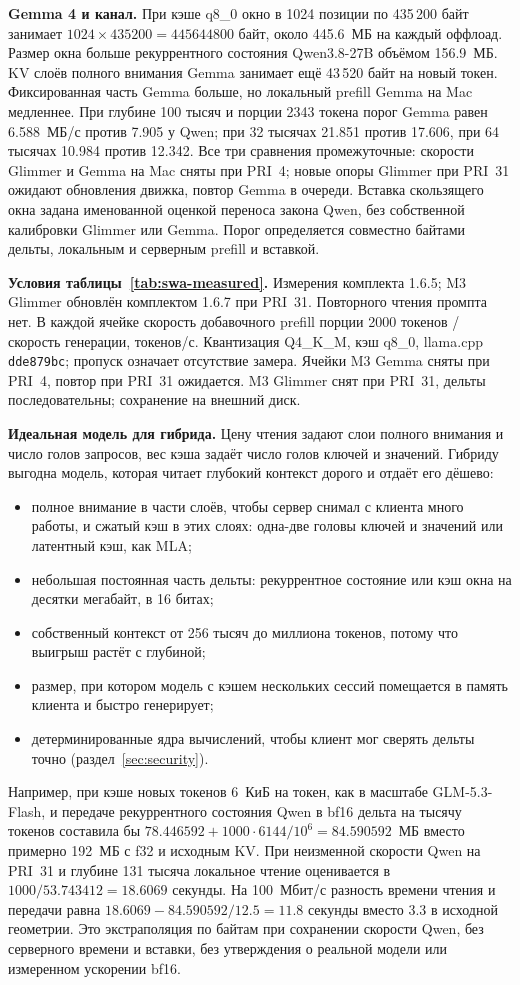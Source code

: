 \textbf{Gemma 4 и канал.} При кэше q8\_0 окно в 1024 позиции по 435\,200 байт
занимает $1024\times435200=445644800$ байт, около 445.6~МБ на каждый оффлоад.
Размер окна больше рекуррентного состояния Qwen3.8-27B объёмом 156.9~МБ.
KV слоёв полного внимания Gemma занимает ещё 43\,520 байт на новый токен.
Фиксированная часть Gemma больше, но локальный prefill Gemma на Mac медленнее.
При глубине 100 тысяч и порции 2343 токена порог Gemma равен 6.588~МБ/с против 7.905 у Qwen;
при 32 тысячах 21.851 против 17.606, при 64 тысячах 10.984 против 12.342.
Все три сравнения промежуточные: скорости Glimmer и Gemma на Mac сняты при PRI~4;
новые опоры Glimmer при PRI~31 ожидают обновления движка, повтор Gemma в очереди. Вставка скользящего окна задана именованной оценкой переноса закона Qwen,
без собственной калибровки Glimmer или Gemma.
Порог определяется совместно байтами дельты, локальным и серверным prefill и вставкой.

\textbf{Условия таблицы~\ref{tab:swa-measured}.} Измерения комплекта 1.6.5; M3 Glimmer обновлён комплектом 1.6.7 при PRI~31. Повторного чтения промпта нет. В каждой ячейке скорость
добавочного prefill порции 2000 токенов / скорость генерации, токенов/с.
Квантизация Q4\_K\_M, кэш q8\_0, llama.cpp \texttt{dde879bc}; пропуск означает отсутствие замера. Ячейки M3 Gemma сняты при PRI~4, повтор при PRI~31 ожидается. M3 Glimmer снят при PRI~31, дельты последовательны; сохранение на внешний диск.

\textbf{Идеальная модель для гибрида.} Цену чтения задают слои полного внимания и число голов запросов, вес кэша
задаёт число голов ключей и значений. Гибриду выгодна модель, которая читает глубокий контекст дорого и отдаёт его
дёшево:
\begin{itemize}
\item полное внимание в части слоёв, чтобы сервер снимал с клиента много работы, и сжатый кэш в этих слоях: одна-две
головы ключей и значений или латентный кэш, как MLA;
\item небольшая постоянная часть дельты: рекуррентное состояние или кэш окна на десятки мегабайт, в 16 битах;
\item собственный контекст от 256 тысяч до миллиона токенов, потому что выигрыш растёт с глубиной;
\item размер, при котором модель с кэшем нескольких сессий помещается в память клиента и быстро генерирует;
\item детерминированные ядра вычислений, чтобы клиент мог сверять дельты точно (раздел~\ref{sec:security}).
\end{itemize}
Например, при кэше новых токенов 6~КиБ на токен, как в масштабе GLM-5.3-Flash,
и передаче рекуррентного состояния Qwen в bf16 дельта на тысячу токенов составила бы
$78.446592+1000\cdot6144/10^6=84.590592$~МБ вместо примерно 192~МБ с f32 и исходным KV.
При неизменной скорости Qwen на PRI~31 и глубине 131 тысяча локальное чтение оценивается в
$1000/53.743412=18.6069$ секунды. На 100~Мбит/с разность времени чтения и передачи равна
$18.6069-84.590592/12.5=11.8$ секунды вместо 3.3 в исходной геометрии.
Это экстраполяция по байтам при сохранении скорости Qwen, без серверного времени и вставки,
без утверждения о реальной модели или измеренном ускорении bf16.

